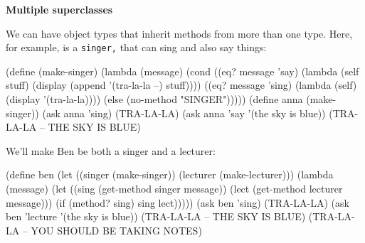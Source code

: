 %
%
%
%
%
%
%
%
% 
%

{\bf Multiple superclasses}

We can have object types that inherit methods from more than one type.
Here, for example, is a {\tt singer,} that can sing and also say things: 

\beginlisp
(define (make-singer)
  (lambda (message)
    (cond ((eq? message 'say)
           (lambda (self stuff)
             (display (append '(tra-la-la --) stuff))))
          ((eq? message 'sing)
           (lambda (self)
             (display '(tra-la-la))))
          (else (no-method "SINGER")))))
\null
(define anna (make-singer))
\null
(ask anna 'sing)
(TRA-LA-LA)
\null
(ask anna 'say '(the sky is blue))
(TRA-LA-LA -- THE SKY IS BLUE)
\null
\endlisp

We'll make Ben be both a singer and a lecturer:

\beginlisp
(define ben
  (let ((singer (make-singer))
        (lecturer (make-lecturer)))
    (lambda (message)
      (let ((sing (get-method singer message))
            (lect (get-method lecturer message)))
        (if (method? sing)
            sing
            lect)))))
\null
(ask ben 'sing)
(TRA-LA-LA)
\null
(ask ben 'lecture '(the sky is blue))
(TRA-LA-LA -- THE SKY IS BLUE)
(TRA-LA-LA -- YOU SHOULD BE TAKING NOTES)
\null
\endlisp

